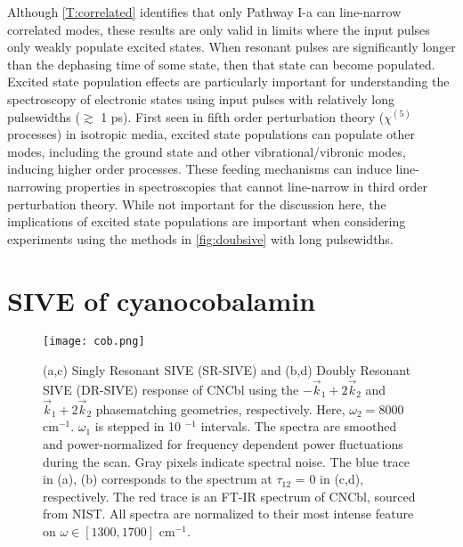 \documentclass[aip, jcp, draft, onecolumn]{revtex4-2}
\begin{document}
Although \autoref{T:correlated} identifies that only Pathway I-a can line-narrow correlated modes, these results are only valid in limits where the input pulses only weakly populate excited states.
When resonant pulses are significantly longer than the dephasing time of some state, then that state can become populated.
Excited state population effects are particularly important for understanding the spectroscopy of electronic states using input pulses with relatively long pulsewidths ($\gtrsim$ 1 ps). \cite{RN319}
First seen in fifth order perturbation theory ($\chi^{(5)}$ processes) in isotropic media, excited state populations can populate other modes, including the ground state and other vibrational/vibronic modes, inducing higher order processes.\cite{Carlson87, RN471}
These feeding mechanisms can induce line-narrowing properties in spectroscopies that cannot line-narrow in third order perturbation theory.\cite{RN319, Carlson87, RN471, RN410}
While not important for the discussion here, the implications of excited state populations are important when considering experiments using the methods in \autoref{fig:doubsive} with long pulsewidths. 

\section{SIVE of cyanocobalamin}

\begin{figure*}[!htbp]
	\centering
	\texttt{[image: cob.png]}
	\caption{
		(a,c) Singly Resonant SIVE (SR-SIVE) and (b,d) Doubly Resonant SIVE (DR-SIVE) response of CNCbl using the $-\vec{k}_1 + 2\vec{k}_2$ and $\vec{k}_1 + 2\vec{k}_2$ phasematching geometries, respectively.
		Here, $\omega_2 = 8000$ cm$^{-1}$.
		$\omega_1$ is stepped in 10 $^{-1}$ intervals.
		The spectra are smoothed and power-normalized for frequency dependent power fluctuations during the scan.
		Gray pixels indicate spectral noise.
		The blue trace in (a), (b) corresponds to the spectrum at $\tau_{12}$ = 0 in (c,d), respectively.
		The red trace is an FT-IR spectrum of CNCbl, sourced from NIST. 
		All spectra are normalized to their most intense feature on $\omega \in [1300, 1700]$ cm$^{-1}$.}
	\label{fig:cobsive}
\end{figure*}
\end{document}

